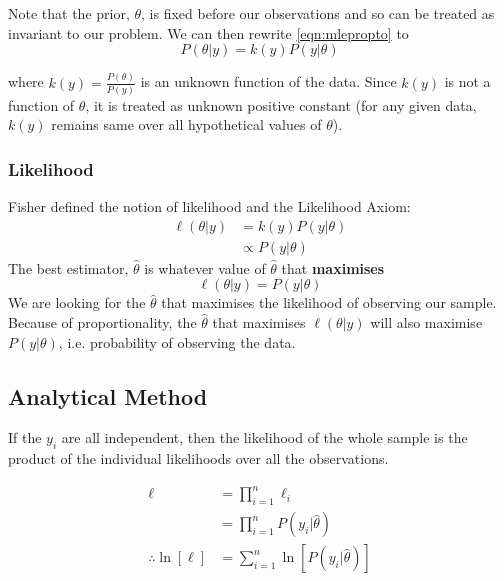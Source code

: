\documentclass{article}
\begin{document}
\noindent Note that the prior, $\theta$, is fixed before our observations and so can be treated as invariant to our problem. We can then rewrite \ref{eqn:mlepropto} to \\

\begin{equation}
    P(\theta\vert y) = k(y) P(y\vert\theta)
\end{equation}

\noindent where $k(y) = \frac{P(\theta)}{P(y)}$ is an unknown function of the data. Since $k(y)$ is not a function of $\theta$, it is treated as unknown positive constant (for any given data, $k(y)$ remains same over all hypothetical values of $\theta$). 

\subsubsection{Likelihood}

\begin{definition}
    Fisher defined the notion of likelihood and the Likelihood Axiom: 
    \begin{align*}
        \ell (\theta\vert y) &= k(y) P(y\vert \theta) \\
        &\propto P(y\vert \theta)
    \end{align*}    
    \noindent The best estimator, $\hat{\theta}$ is whatever value of $\hat{\theta}$ that \textbf{maximises} 
    \begin{equation*}
        \ell (\theta\vert y) = P(y\vert\theta)
    \end{equation*}
    \noindent We are looking for the $\hat{\theta}$ that maximises the likelihood of observing our sample. Because of proportionality, the $\hat{\theta}$ that maximises $\ell (\theta\vert y)$ will also maximise $P(y\vert \theta)$, i.e. probability of observing the data. 
\end{definition}

\subsection{Analytical Method}

If the $y_i$ are all independent, then the likelihood of the whole sample is the product of the individual likelihoods over all the observations. 

\begin{align*}
    \ell &= \prod_{i=1}^{n} \ell_i \\
    &= \prod_{i=1}^{n}P(y_i | \hat{\theta}) \\ 
    \therefore \ln [\ell] &= \sum_{i=1}^{n} \ln [P(y_i | \hat{\theta})] 
\end{align*}
\end{document}
